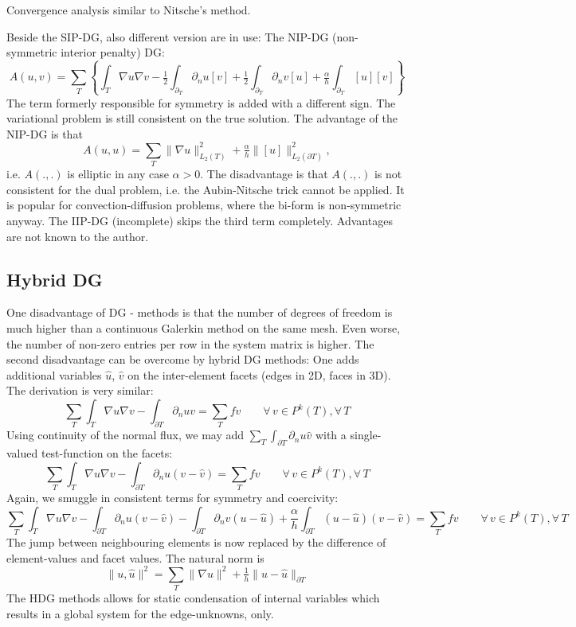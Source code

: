 Convergence analysis similar to Nitsche's method.


Beside the SIP-DG, also different version are in use: The NIP-DG
(non-symmetric interior penalty) DG:
$$
A(u,v) = \sum_T \left\{ \int_T \nabla u \nabla v
  - \tfrac{1}{2} \int_{\partial_T} \partial_n u [v]  
+ \tfrac{1}{2} \int_{\partial_T} \partial_n v [u] 
  +  \tfrac{\alpha}{h} \int_{\partial_T} [u] [v] \right\}
$$
The term formerly responsible for symmetry is added with a different
sign. The variational problem is still consistent on the true
solution. The advantage of the NIP-DG is that
$$
A(u,u) = \sum_T \| \nabla u \|^2_{L_2(T)} + \tfrac{\alpha}{h} \| [u]
\|_{L_2(\partial T)}^2,
$$
i.e. $A(.,.)$ is elliptic in any case $\alpha > 0$. The disadvantage
is that $A(.,.)$ is not consistent for the dual problem, i.e. the
Aubin-Nitsche trick cannot be applied. It is popular for
convection-diffusion problems, where the bi-form is non-symmetric
anyway. The IIP-DG (incomplete) skips the third term
completely. Advantages are not known to the author.

\subsection{Hybrid DG}
One disadvantage of DG - methods is that the number of degrees of
freedom is much higher than a continuous Galerkin method on the same
mesh. Even worse, the number of non-zero entries per row in the system
matrix is higher. The second disadvantage can be overcome by hybrid DG
methods: One adds additional variables $\hat u$, $\hat v$ on the inter-element facets (edges in 2D,
faces in 3D). The derivation is very similar:
$$
\sum_T \int_T \nabla u \nabla v - \int_{\partial T} \partial_n u v = \sum_T f  
v  \qquad \forall \, v \in P^k(T), \forall \, T  
$$ 
Using continuity of the normal flux, we may add $\sum_T \int_{\partial
  T} \partial_n u \hat v$ with a single-valued test-function on the
facets:
$$
\sum_T \int_T \nabla u \nabla v - \int_{\partial T} \partial_n u
(v-\hat v) = \sum_T f 
v  \qquad \forall \, v \in P^k(T), \forall \, T 
$$
Again, we smuggle in consistent terms for symmetry and coercivity:
$$
\sum_T \int_T \nabla u \nabla v
 - \int_{\partial T} \partial_n u (v-\hat v) 
 - \int_{\partial T} \partial_n v (u-\hat u) 
 + \frac{\alpha}{h} \int_{\partial T}  (u-\hat u) (v-\hat v) 
= \sum_T f 
v  \qquad \forall \, v \in P^k(T), \forall \, T 
$$
The jump between neighbouring elements is now replaced by the
difference of element-values and facet values. The natural norm is
$$
\| u, \hat u\|^2 = \sum_T \| \nabla u \|^2 + \tfrac{1}{h}  \| u - \hat
u \|_{\partial T}
$$
The HDG methods allows for static condensation of internal variables
which results in a global system for the edge-unknowns, only.

